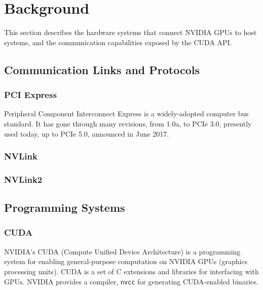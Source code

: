 \chapter{Background}

This section describes the hardware systems that connect NVIDIA GPUs to host systems, and the communication capabilities exposed by the CUDA API.

%
%
%
\section{Communication Links and Protocols}

\subsection{PCI Express}

Peripheral Component Interconnect Express is a widely-adopted computer bus standard.
It has gone through many revisions, from 1.0a, to PCIe 3.0, presently used today, up to PCIe 5.0, announced in June 2017.

\subsection{NVLink}
\subsection{NVLink2}




%
%
%
\section{Programming Systems}
\subsection{CUDA}
\label{sec:cuda}

NVIDIA's CUDA (Compute Unified Device Architecture) is a programming system for enabling general-purpose computation on NVIDIA GPUs (graphics processing units).
CUDA is a set of C extensions and libraries for interfacing with GPUs.
NVIDIA provides a compiler, \texttt{nvcc} for generating CUDA-enabled binaries.

